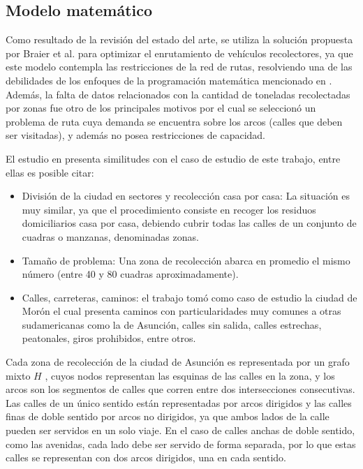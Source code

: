 \documentclass[conference]{IEEEtran}
\begin{document}
\subsection{Modelo matemático}

Como resultado de la revisión del estado del arte, se utiliza la solución propuesta por Braier et al. \cite{Braier2017AnArgentina} para optimizar el enrutamiento de vehículos recolectores, ya que este modelo contempla las restricciones de la red de rutas, resolviendo una de las debilidades de los enfoques de la programación matemática mencionado en \cite{Sulemana2018OptimalMethods}. Además, la falta de datos relacionados con la cantidad de toneladas recolectadas por zonas fue otro de los principales motivos por el cual se seleccionó un problema de ruta cuya demanda se encuentra sobre los arcos (calles que deben ser visitadas), y además no posea restricciones de capacidad.

El estudio en \cite{Braier2017AnArgentina} presenta similitudes con el caso de estudio de este trabajo, entre ellas es posible citar:

\begin{itemize}
    \item División de la ciudad en sectores y recolección casa por casa: La situación es muy similar, ya que el procedimiento consiste en recoger los residuos domiciliarios casa por casa, debiendo cubrir todas las calles de un conjunto de cuadras o manzanas, denominadas zonas.
    \item Tamaño de problema: Una zona de recolección abarca en promedio el mismo número (entre 40 y 80 cuadras aproximadamente).
    \item Calles, carreteras, caminos: el trabajo \cite{Braier2017AnArgentina} tomó como caso de estudio la ciudad de Morón el cual presenta caminos con particularidades muy comunes a otras sudamericanas como la de Asunción, calles sin salida, calles estrechas, peatonales, giros prohibidos, entre otros.
\end{itemize}

Cada zona de recolección de la ciudad de Asunción es representada por un grafo mixto $H$ \cite{Braier2017AnArgentina}, cuyos nodos representan las esquinas de las calles en la zona, y los arcos son los segmentos de calles que corren entre dos intersecciones consecutivas. Las calles de un único sentido están representadas por arcos dirigidos y las calles finas de doble sentido por arcos no dirigidos, ya que ambos lados de la calle pueden ser servidos en un solo viaje. En el caso de calles anchas de doble sentido, como las avenidas, cada lado debe ser servido de forma separada, por lo que estas calles se representan con dos arcos dirigidos, una en cada sentido.
\end{document}
